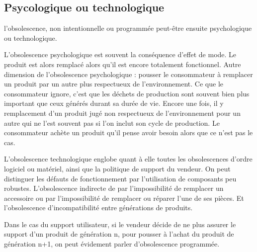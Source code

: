 \subsection{Psycologique ou technologique}

l’obsolescence, non intentionnelle ou programmée peut-être ensuite psychologique ou technologique. 

L’obsolescence psychologique est souvent la conséquence d’effet de mode. Le produit est alors remplacé alors qu’il est encore totalement fonctionnel. Autre dimension de l’obsolescence psychologique : pousser le consommateur à remplacer un produit par un autre plus respectueux de l’environnement. Ce que le consommateur ignore, c’est que les déchets de production sont souvent bien plus important que ceux générés durant sa durée de vie. Encore une fois, il y remplacement d’un produit jugé non respectueux de l’environnement pour un autre qui ne l’est souvent pas si l’on inclut son cycle de production. Le consommateur achète un produit qu'il pense avoir besoin alors que ce n'est pas le cas.

L’obsolescence technologique englobe quant à elle toutes les obsolescences d’ordre logiciel ou matériel, ainsi que la politique de support du vendeur. On peut distinguer les défauts de fonctionnement par l’utilisation de composants peu robustes. L’obsolescence indirecte de par l'impossibilité de remplacer un accessoire ou par l’impossibilité de remplacer ou réparer l’une de ses pièces. Et l’obsolescence d’incompatibilité entre générations de produits.

 Dans le cas du support utilisateur, si le vendeur décide de ne plus assurer le support d’un produit de génération n, pour pousser à l’achat du produit de génération n+1, on peut évidement parler d'obsolescence programmée.  


